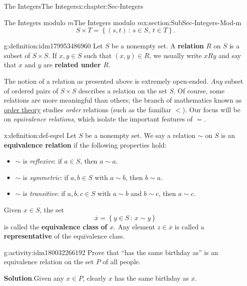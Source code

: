 \documentclass[oneside,10pt,]{book}
\newcommand{\blocktitlefont}{\relax}
\newcommand{\terminology}[1]{\textbf{#1}}
\numberwithin{equation}{section}
\newcommand{\setof}[2]{{\left\{#1\,\colon\,#2\right\}}}
\newcommand{\lt}{<}
\begin{document}
\begin{chapterptx}{The Integers}{}{The Integers}{}{}{x:chapter:Sec-Integers}
\begin{sectionptx}{The Integers modulo \(m\)}{}{The Integers modulo \(m\)}{}{}{x:section:SubSec-Integers-Mod-m}
%
\begin{equation*}
S\times T = \setof{(s,t)}{s\in S, \ t\in T}.
\end{equation*}
\begin{definition}{}{g:definition:idm179953486960}%
%
Let \(S\) be a nonempty set. A \terminology{relation} \(R\) on \(S\) is a subset of \(S\times S\). If \(x,y\in S\) such that \((x,y)\in R\), we usually write \(xRy\) and say that \(x\) and \(y\) are \terminology{related under \(R\)}.%
\end{definition}
The notion of a relation as presented above is extremely open-ended. \emph{Any} subset of ordered pairs of \(S\times S\) describes a relation on the set \(S\). Of course, some relations are more meaningful than others; the branch of mathematics known as \href{https://en.wikipedia.org/wiki/Order_theory}{order theory} studies \emph{order} relations (such as the familiar \(\lt\)). Our focus will be on \emph{equivalence relations}, which isolate the important features of \(=\).%
\begin{definition}{}{x:definition:def-eqrel}%
%
%
%
Let \(S\) be a nonempty set. We say a relation \(\sim\) on \(S\) is an \terminology{equivalence relation} if the following properties hold:%
\begin{itemize}[label=\textbullet]
\item{}\(\sim\) is \emph{reflexive}: if \(a\in S\), then \(a\sim a\).%
\item{}\(\sim\) is \emph{symmetric}: if \(a,b\in S\) with \(a\sim b\), then \(b\sim a\).%
\item{}\(\sim\) is \emph{transitive}: if \(a,b,c\in S\) with \(a\sim b\) and \(b\sim c\), then \(a\sim c\).%
\end{itemize}
%
\par
Given \(x\in S\), the set%
\begin{equation*}
\overline{x} = \setof{y\in S}{x\sim y}
\end{equation*}
is called the \terminology{equivalence class of \(x\)}. Any element \(z\in \overline{x}\) is called a \terminology{representative} of the equivalence class.%
\end{definition}
\begin{activity}{}{g:activity:idm180032266192}%
Prove that ``has the same birthday as'' is an equivalence relation on the set \(P\) of all people.%
\par\smallskip%
\noindent\textbf{\blocktitlefont Solution}.\hypertarget{g:solution:idm179948516848}{}\quad{}Given any \(x\in P\), clearly \(x\) has the same birthday as \(x\).%

\end{activity}
\end{sectionptx}
\end{chapterptx}
\end{document}
